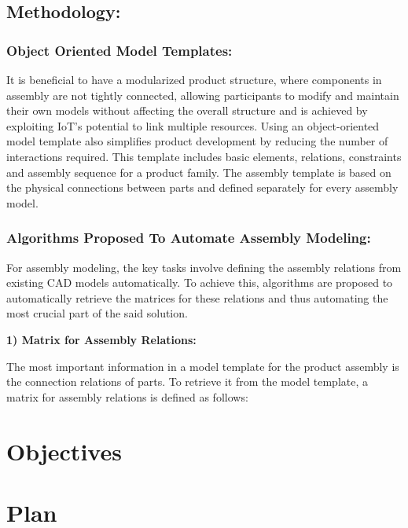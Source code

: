 \documentclass{article}
\begin{document}
\subsection{Methodology:}
\subsubsection{Object Oriented Model Templates:}
It is beneficial to have a modularized product structure, where components in assembly are not tightly connected, allowing participants to modify and maintain their own models without affecting the overall structure and is achieved by exploiting IoT's potential to link multiple resources. Using an object-oriented model template also simplifies product development by reducing the number of interactions required. This template includes basic elements, relations, constraints and assembly sequence for a product family. The assembly template is based on the physical connections between parts and defined separately for every assembly model.

\subsubsection{Algorithms Proposed To Automate Assembly Modeling:}
For assembly modeling, the key tasks involve defining the assembly relations from existing CAD models automatically. To achieve this, algorithms are proposed to automatically retrieve the matrices for these relations and thus automating the most crucial part of the said solution.

\textbf{1) Matrix for Assembly Relations:}

 The most important information in a model template for the product assembly is the connection relations of parts. To retrieve it from the model template, a matrix for assembly
relations is defined as follows:



\section*{Objectives}
\lipsum[3-3]

\section*{Plan}
\lipsum[4-4]
\end{document}

